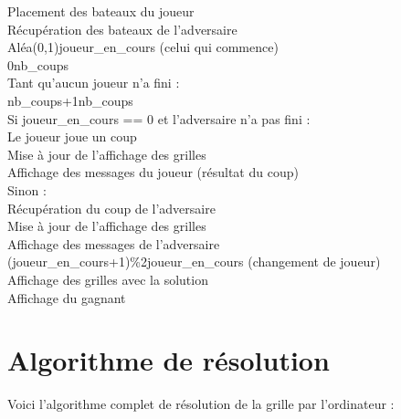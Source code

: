 \begin{algo1}\label{algo_partie}
Placement des bateaux du joueur\\
Récupération des bateaux de l'adversaire\\
Aléa(0,1)\sto joueur\_en\_cours (celui qui commence)\\
0\sto nb\_coups\\
Tant qu'aucun joueur n'a fini :\\
nb\_coups+1\sto nb\_coups\\
Si joueur\_en\_cours == 0 et l'adversaire n'a pas fini :\\
Le joueur joue un coup\\
Mise à jour de l'affichage des grilles\\
Affichage des messages du joueur (résultat du coup)\\
Sinon :\\
Récupération du coup de l'adversaire\\
Mise à jour de l'affichage des grilles\\
Affichage des messages de l'adversaire\\
(joueur\_en\_cours+1)\%2\sto joueur\_en\_cours (changement de joueur)\\
Affichage des grilles avec la solution\\
Affichage du gagnant\\
\end{algo1}

\newpage
\section{Algorithme de résolution}\label{algo_resolution}
Voici l'algorithme complet de résolution de la grille par l'ordinateur :

